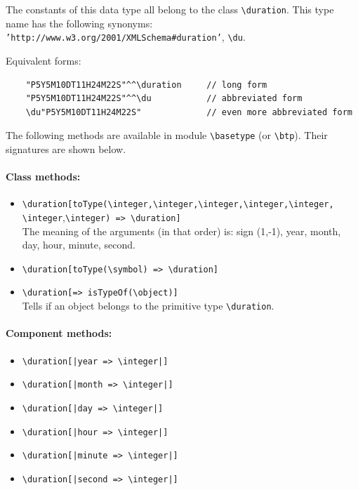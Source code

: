 \documentclass[11pt]{article}
\newcommand{\bs}{\textbackslash}
\begin{document}
\index{class!\bs{}duration}
The constants of this data type all belong to the class {\tt \bs{}duration}. 
This type name has the following synonyms:
{\tt 'http://www.w3.org/2001/XMLSchema\#duration'},
{\tt \bs{}du}.

\noindent
Equivalent forms:
\begin{verbatim}
    "P5Y5M10DT11H24M22S"^^\duration     // long form
    "P5Y5M10DT11H24M22S"^^\du           // abbreviated form
    \du"P5Y5M10DT11H24M22S"             // even more abbreviated form
\end{verbatim}
\noindent
The following methods are available in module {\tt \bs{}basetype} (or \texttt{\bs{}btp}).
Their signatures are shown below.
\paragraph{Class methods:}
\begin{itemize}
\item
  {\tt \bs{}duration[toType(\bs{}integer,\bs{}integer,\bs{}integer,\bs{}integer,\bs{}integer,}
  \\
    \hspace*{3.5cm}\texttt{\bs{}integer},{\tt \bs{}integer) => \bs{}duration]}
  \\
  The meaning of the arguments (in that order) is: sign (1,-1), year, month, day, hour, minute, second.
\item
  {\tt \bs{}duration[toType(\bs{}symbol) => \bs{}duration]}
\item
  {\tt \bs{}duration[=> isTypeOf(\bs{}object)]}
  \\
  Tells if an object belongs to the primitive type {\tt \bs{}duration}.  
\end{itemize}

\paragraph{Component methods:}
\begin{itemize}
      \item {\tt \bs{}duration[|year => \bs{}integer|]}  
      \item {\tt \bs{}duration[|month => \bs{}integer|]}  
      \item {\tt \bs{}duration[|day => \bs{}integer|]}  
      \item {\tt \bs{}duration[|hour => \bs{}integer|]}
      \item {\tt \bs{}duration[|minute => \bs{}integer|]}  
      \item {\tt \bs{}duration[|second => \bs{}integer|]}   
    \end{itemize}
\end{document}
